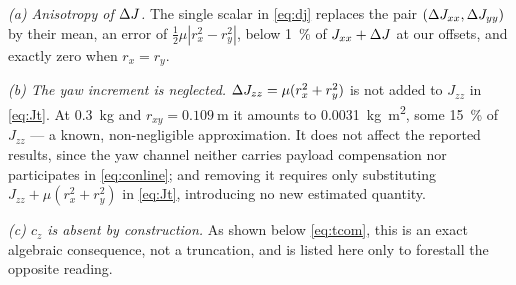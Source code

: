 \emph{(a) Anisotropy of $\Delta J$.} The single scalar in \eqref{eq:dj}
replaces the pair $(\Delta J_{xx}, \Delta J_{yy})$ by their mean, an error of
$\tfrac{1}{2}\mu|r_x^2 - r_y^2|$, below \SI{1}{\percent} of $J_{xx}+\Delta J$ at
our offsets, and exactly zero when $r_x = r_y$.

\emph{(b) The yaw increment is neglected.} $\Delta J_{zz} = \mu(r_x^2 + r_y^2)$
is not added to $J_{zz}$ in \eqref{eq:Jt}. At \SI{0.3}{\kg} and
$r_{xy} = \SI{0.109}{\meter}$ it amounts to \SI{0.0031}{\kg\meter\squared},
some \SI{15}{\percent} of $J_{zz}$ --- a known, non-negligible
approximation. It does not affect the reported results, since the yaw
channel neither carries payload compensation nor participates in
\eqref{eq:conline}; and removing it requires only substituting
$J_{zz} + \mu(r_x^2 + r_y^2)$ in \eqref{eq:Jt}, introducing no new
estimated quantity.

\emph{(c) $c_z$ is absent by construction.} As shown below
\eqref{eq:tcom}, this is an exact algebraic consequence, not a truncation,
and is listed here only to forestall the opposite reading.
